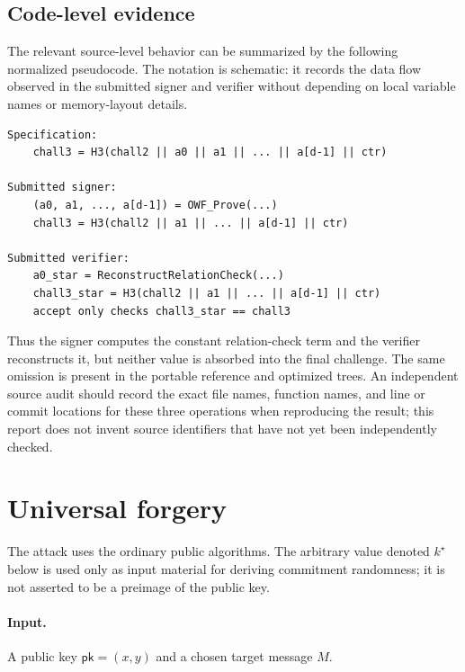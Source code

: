 \documentclass[11pt,a4paper]{article}
\newcommand{\pk}{\mathsf{pk}}
\begin{document}
\subsection{Code-level evidence}
\label{sec:code-evidence}

The relevant source-level behavior can be summarized by the following
normalized pseudocode.  The notation is schematic: it records the data flow
observed in the submitted signer and verifier without depending on local
variable names or memory-layout details.

\begin{verbatim}
Specification:
    chall3 = H3(chall2 || a0 || a1 || ... || a[d-1] || ctr)

Submitted signer:
    (a0, a1, ..., a[d-1]) = OWF_Prove(...)
    chall3 = H3(chall2 || a1 || ... || a[d-1] || ctr)

Submitted verifier:
    a0_star = ReconstructRelationCheck(...)
    chall3_star = H3(chall2 || a1 || ... || a[d-1] || ctr)
    accept only checks chall3_star == chall3
\end{verbatim}

Thus the signer computes the constant relation-check term and the verifier
reconstructs it, but neither value is absorbed into the final challenge.  The
same omission is present in the portable reference and optimized trees.  An
independent source audit should record the exact file names, function names,
and line or commit locations for these three operations when reproducing the
result; this report does not invent source identifiers that have not yet been
independently checked.

\section{Universal forgery}
\label{sec:attack}

The attack uses the ordinary public algorithms.  The arbitrary value denoted
$k^{\star}$ below is used only as input material for deriving commitment
randomness; it is not asserted to be a preimage of the public key.

\paragraph{Input.}
A public key $\pk=(x,y)$ and a chosen target message $M$.
\end{document}

